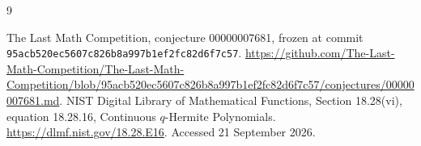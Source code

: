 \documentclass[11pt]{article}
\begin{document}
\begin{thebibliography}{9}
\raggedright
{}
The Last Math Competition, conjecture 00000007681,
frozen at commit \texttt{95acb520ec5607c826b8a997b1ef2fc82d6f7c57}.
\url{https://github.com/The-Last-Math-Competition/The-Last-Math-Competition/blob/95acb520ec5607c826b8a997b1ef2fc82d6f7c57/conjectures/00000007681.md}.
NIST Digital Library of Mathematical Functions,
Section 18.28(vi), equation 18.28.16, Continuous $q$-Hermite Polynomials.
\url{https://dlmf.nist.gov/18.28.E16}. Accessed 21 September 2026.
\end{thebibliography}
\end{document}
